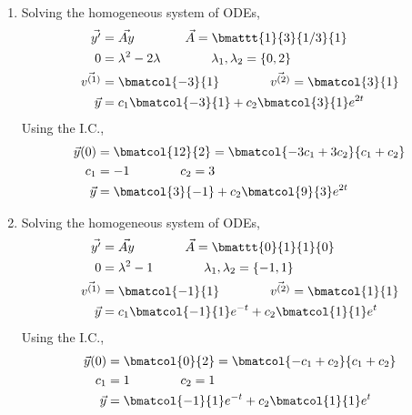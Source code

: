 \begin{enumerate}
    \item Solving the homogeneous system of ODEs,
          \begin{align}
              \vec{y'}      & = \vec{Ay}
              \qquad\qquad
              \vec{A}                           = \bmattt{1}{3}{1/3}{1} \\
              0             & = \lambda^{2} - 2\lambda
              \qquad\qquad
              \lambda_1, \lambda_2              = \left\{ 0, 2 \right\} \\
              \vec{v^{(1)}} & = \bmatcol{-3}{1}
              \qquad\qquad
              \vec{v^{(2)}} = \bmatcol{3}{1}                            \\
              \vec{y}       & = c_1 \bmatcol{-3}{1}
              + c_2\bmatcol{3}{1}e^{2t}
          \end{align}
          Using the I.C.,
          \begin{align}
              \vec{y}(0) & = \bmatcol{12}{2} = \bmatcol{-3c_1 + 3c_2}{c_1 + c_2} \\
              c_1        & = -1 \qquad\qquad c_2 = 3                             \\
              \vec{y}    & = \bmatcol{3}{-1}
              + c_2\bmatcol{9}{3}e^{2t}
          \end{align}

    \item Solving the homogeneous system of ODEs,
          \begin{align}
              \vec{y'}      & = \vec{Ay}
              \qquad\qquad
              \vec{A}                           = \bmattt{0}{1}{1}{0}    \\
              0             & = \lambda^{2} - 1
              \qquad\qquad
              \lambda_1, \lambda_2              = \left\{ -1, 1 \right\} \\
              \vec{v^{(1)}} & = \bmatcol{-1}{1}
              \qquad\qquad
              \vec{v^{(2)}} = \bmatcol{1}{1}                             \\
              \vec{y}       & = c_1 \bmatcol{-1}{1}e^{-t}
              + c_2\bmatcol{1}{1}e^{t}
          \end{align}
          Using the I.C.,
          \begin{align}
              \vec{y}(0) & = \bmatcol{0}{2} = \bmatcol{-c_1 + c_2}{c_1 + c_2} \\
              c_1        & = 1 \qquad\qquad c_2 = 1                           \\
              \vec{y}    & = \bmatcol{-1}{1}e^{-t}
              + c_2\bmatcol{1}{1}e^{t}
          \end{align}


\end{enumerate}
